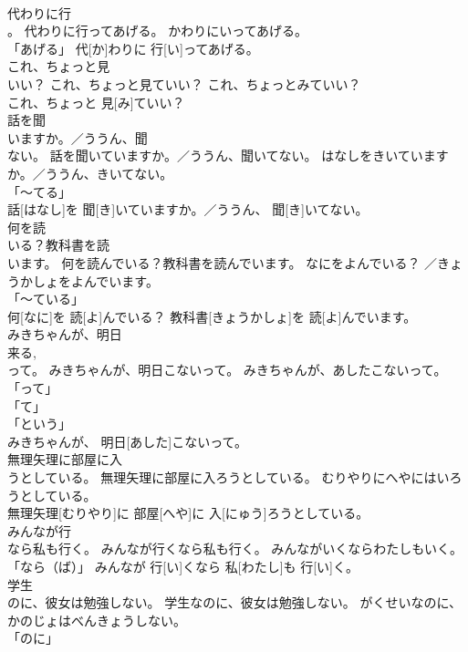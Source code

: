 \documentclass[8pt]{extreport}
\begin{document}
\begin{CJK}{UTF8}{min}
\\	代わりに行
\\	。	代わりに行ってあげる。	かわりにいってあげる。	
\\	「あげる」	代[か]わりに 行[い]ってあげる。		
\\	これ、ちょっと見
\\	いい？	これ、ちょっと見ていい？	これ、ちょっとみていい？	
\\	これ、ちょっと 見[み]ていい？		
\\	話を聞
\\	いますか。／ううん、聞
\\	ない。	話を聞いていますか。／ううん、聞いてない。	はなしをきいていますか。／ううん、きいてない。	
\\	「～てる」 
\\	話[はなし]を 聞[き]いていますか。／ううん、 聞[き]いてない。		
\\	何を読
\\	いる？教科書を読
\\	います。	何を読んでいる？教科書を読んでいます。	なにをよんでいる？ ／きょうかしょをよんでいます。	
\\	「～ている」 
\\	何[なに]を 読[よ]んでいる？ 教科書[きょうかしょ]を 読[よ]んでいます。		
\\	みきちゃんが、明日
\\	来る, 
\\	って。	みきちゃんが、明日こないって。	みきちゃんが、あしたこないって。	
\\	「って」 
\\	「て」 
\\	「という」 
\\	みきちゃんが、 明日[あした]こないって。		
\\	無理矢理に部屋に入
\\	うとしている。	無理矢理に部屋に入ろうとしている。	むりやりにへやにはいろうとしている。	
\\	無理矢理[むりやり]に 部屋[へや]に 入[にゅう]ろうとしている。		
\\	みんなが行
\\	なら私も行く。	みんなが行くなら私も行く。	みんながいくならわたしもいく。	
\\	「なら（ば）」	みんなが 行[い]くなら 私[わたし]も 行[い]く。		
\\	学生
\\	のに、彼女は勉強しない。	学生なのに、彼女は勉強しない。	がくせいなのに、かのじょはべんきょうしない。	
\\	「のに」 

\end{CJK}
\end{document}
